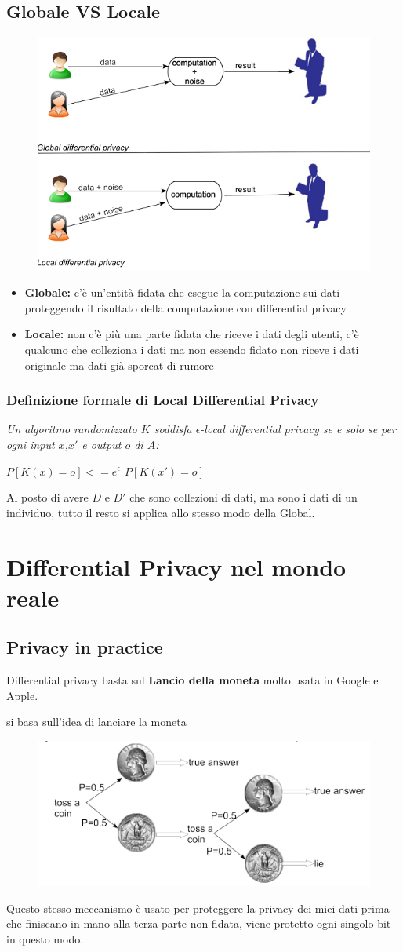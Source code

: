\documentclass{report}
\begin{document}
\section{Globale VS Locale}
\begin{figure}[H]
        \centering
        \includegraphics[width=0.3\linewidth]{images/Gloabl.png}
\end{figure}
\begin{itemize}
    \item \textbf{Globale:} c'è un'entità fidata che esegue la computazione sui dati proteggendo il risultato della computazione con differential privacy
    \item \textbf{Locale:} non c'è più una parte fidata che riceve i dati degli utenti, c'è qualcuno che colleziona i dati ma non essendo fidato non riceve i dati originale ma dati già sporcat di rumore
\end{itemize}

\subsection{Definizione formale di Local Differential Privacy}
\textit{Un algoritmo randomizzato $K$ soddisfa $\epsilon$-local differential privacy
se e solo se per ogni input $x$,$x'$ e output $o$ di $A$:}
\begin{center}
    \textit{$P[K(x) = o]<= e^\epsilon$ $P[K(x') = o]$}
\end{center}

\noindent Al posto di avere $D$ e $D'$ che sono collezioni di dati, ma sono i dati di un individuo, tutto il resto si applica allo stesso modo della Global.

\chapter{Differential Privacy nel mondo reale}
\section{Privacy in practice}
Differential privacy basta sul \textbf{Lancio della moneta} molto usata in Google e Apple.

\noindent si basa sull'idea di lanciare la moneta
\begin{figure}[H]
        \centering
        \includegraphics[width=0.3\linewidth]{images/coin.png}
\end{figure}
\noindent Questo stesso meccanismo è usato per proteggere la privacy dei miei dati prima che finiscano in mano alla terza parte non fidata,
viene protetto ogni singolo bit in questo modo. 
\end{document}
